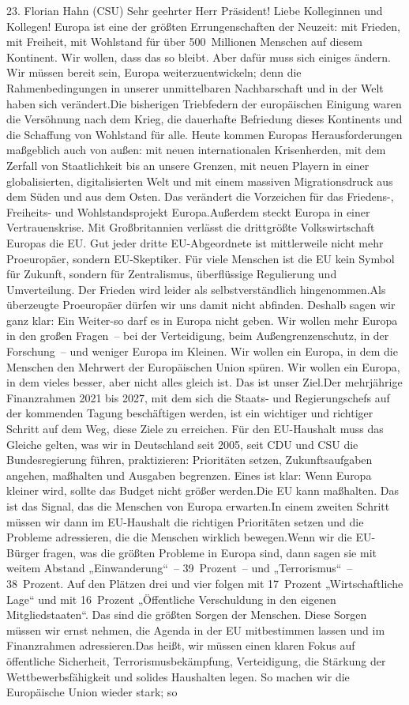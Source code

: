 \documentclass{article}
\begin{document}
	23. Florian Hahn (CSU) Sehr geehrter Herr Präsident! Liebe Kolleginnen und Kollegen! Europa ist eine der größten Errungenschaften der Neuzeit: mit Frieden, mit Freiheit, mit Wohlstand für über 500 Millionen Menschen auf diesem Kontinent. Wir wollen, dass das so bleibt. Aber dafür muss sich einiges ändern. Wir müssen bereit sein, Europa weiterzuentwickeln; denn die Rahmenbedingungen in unserer unmittelbaren Nachbarschaft und in der Welt haben sich verändert.Die bisherigen Triebfedern der europäischen Einigung waren die Versöhnung nach dem Krieg, die dauerhafte Befriedung dieses Kontinents und die Schaffung von Wohlstand für alle. Heute kommen Europas Herausforderungen maßgeblich auch von außen: mit neuen internationalen Krisenherden, mit dem Zerfall von Staatlichkeit bis an unsere Grenzen, mit neuen Playern in einer globalisierten, digitalisierten Welt und mit einem massiven Migrationsdruck aus dem Süden und aus dem Osten. Das verändert die Vorzeichen für das Friedens-, Freiheits- und Wohlstandsprojekt Europa.Außerdem steckt Europa in einer Vertrauenskrise. Mit Großbritannien verlässt die drittgrößte Volkswirtschaft Europas die EU. Gut jeder dritte EU-Abgeordnete ist mittlerweile nicht mehr Proeuropäer, sondern EU-Skeptiker. Für viele Menschen ist die EU kein Symbol für Zukunft, sondern für Zentralismus, überflüssige Regulierung und Umverteilung. Der Frieden wird leider als selbstverständlich hingenommen.Als überzeugte Proeuropäer dürfen wir uns damit nicht abfinden. Deshalb sagen wir ganz klar: Ein Weiter-so darf es in Europa nicht geben. Wir wollen mehr Europa in den großen Fragen – bei der Verteidigung, beim Außengrenzenschutz, in der Forschung – und weniger Europa im Kleinen. Wir wollen ein Europa, in dem die Menschen den Mehrwert der Europäischen Union spüren. Wir wollen ein Europa, in dem vieles besser, aber nicht alles gleich ist. Das ist unser Ziel.Der mehrjährige Finanzrahmen 2021 bis 2027, mit dem sich die Staats- und Regierungschefs auf der kommenden Tagung beschäftigen werden, ist ein wichtiger und richtiger Schritt auf dem Weg, diese Ziele zu erreichen. Für den EU-Haushalt muss das Gleiche gelten, was wir in Deutschland seit 2005, seit CDU und CSU die Bundesregierung führen, praktizieren: Prioritäten setzen, Zukunftsaufgaben angehen, maßhalten und Ausgaben begrenzen. Eines ist klar: Wenn Europa kleiner wird, sollte das Budget nicht größer werden.Die EU kann maßhalten. Das ist das Signal, das die Menschen von Europa erwarten.In einem zweiten Schritt müssen wir dann im EU-Haushalt die richtigen Prioritäten setzen und die Probleme adressieren, die die Menschen wirklich bewegen.Wenn wir die EU-Bürger fragen, was die größten Probleme in Europa sind, dann sagen sie mit weitem Abstand „Einwanderung“ – 39 Prozent – und „Terrorismus“ – 38 Prozent. Auf den Plätzen drei und vier folgen mit 17 Prozent „Wirtschaftliche Lage“ und mit 16 Prozent „Öffentliche Verschuldung in den eigenen Mitgliedstaaten“. Das sind die größten Sorgen der Menschen. Diese Sorgen müssen wir ernst nehmen, die Agenda in der EU mitbestimmen lassen und im Finanzrahmen adressieren.Das heißt, wir müssen einen klaren Fokus auf öffentliche Sicherheit, Terrorismusbekämpfung, Verteidigung, die Stärkung der Wettbewerbsfähigkeit und solides Haushalten legen. So machen wir die Europäische Union wieder stark; so 
\end{document}
